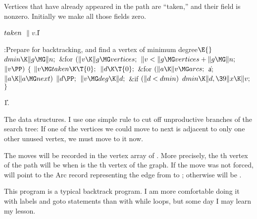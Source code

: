 Vertices that have already appeared in the path are ``taken,''
and
their  field is nonzero. Initially we make all those fields zero.

\Y\B\4\D$\\{taken}$ \5
$\|v.{}$\|I\par
\Y\B\4:Prepare  for backtracking, and find a vertex  of
minimum degree\X${}\E{}$\6
$\\{dmin}\K\|g\MG\|n;{}$\6
\&{for} ${}(\|v\K\|g\MG\\{vertices};{}$ ${}\|v<\|g\MG\\{vertices}+\|g\MG\|n;{}$
${}\|v\PP){}$\5
${}\{{}$\1\6
${}\|v\MG\\{taken}\K\T{0};{}$\6
${}\|d\K\T{0};{}$\6
\&{for} ${}(\|a\K\|v\MG\\{arcs};{}$ \|a; ${}\|a\K\|a\MG\\{next}){}$\1\5
${}\|d\PP;{}$\2\6
${}\|v\MG\\{deg}\K\|d;{}$\6
\&{if} ${}(\|d<\\{dmin}){}$\1\5
${}\\{dmin}\K\|d,\39\|x\K\|v;{}$\2\6
\4${}\}{}$\2\par
\U1.\fi

The data structures. I use one simple rule to cut off
unproductive
branches of the search tree: If one of the vertices we could move to next
is adjacent to only one other unused vertex, we must move to it now.

The moves will be recorded in the vertex array of . More precisely, the
th vertex of the path will be  when  is
the th vertex of
the graph. If the move was not forced,  will point to the
Arc
record representing the edge from  to ; otherwise
 will be \PB{$\NULL$}.

This program is a typical backtrack program. I am more comfortable doing
it with labels and goto statements than with while loops, but some day
I may learn my lesson.

